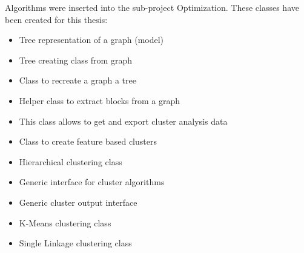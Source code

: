 Algorithms were inserted into the sub-project Optimization. These classes have been created for this thesis:
\begin{itemize}
    \item Tree representation of a graph (model) \newline
    \item Tree creating class from graph \newline
    \item Class to recreate a graph a tree \newline
    \item Helper class to extract blocks from a graph \newline
    \item This class allows to get and export cluster analysis data \newline 
    \item  Class to create feature based clusters \newline 
    \item Hierarchical clustering class \newline 
    \item Generic interface for cluster algorithms\newline
    \item Generic cluster output interface \newline 
    \item K-Means clustering class \newline
    \item Single Linkage clustering class \newline
\end{itemize}

\pagebreak
